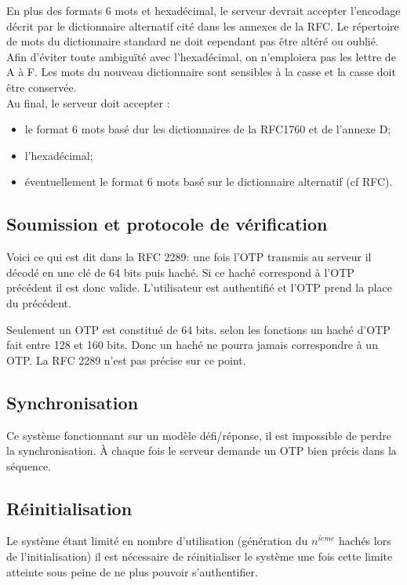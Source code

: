 \documentclass{../res/univ-projet}
\begin{document}
        En plus des formats 6 mots et hexadécimal, le serveur devrait accepter 
l'encodage décrit par le dictionnaire alternatif cité dans les annexes de la RFC. Le répertoire de mots du dictionnaire standard ne doit 
cependant pas être altéré ou oublié. Afin d'éviter toute ambiguïté avec 
l'hexadécimal, on n'emploiera pas les lettre de A à F. Les mots du nouveau dictionnaire sont 
sensibles à la casse et la casse doit être conservée.\\

        Au final, le serveur doit accepter :
        \begin{itemize}
            \item le format 6 mots basé dur les dictionnaires de la RFC1760 et de 
            l'annexe D;
            \item l'hexadécimal;
            \item éventuellement le format 6 mots basé sur le dictionnaire alternatif 
            (cf RFC).
        \end{itemize}
  
  \subsection{Soumission et protocole de vérification}
        Voici ce qui est dit dans la RFC 2289:
    une fois l'OTP transmis au serveur il décodé en une clé de 64 bits puis haché.
    Si ce haché correspond à l'OTP précédent il est donc valide.
    L'utilisateur est authentifié et l'OTP prend la place du précédent.
    
        Seulement un OTP est constitué de 64 bits. selon les fonctions un haché
    d'OTP fait entre 128 et 160 bits. Donc un haché ne pourra jamais correspondre
    à un OTP. La RFC 2289 n'est pas précise sur ce point.
  
  \subsection{Synchronisation}
    Ce système fonctionnant sur un modèle défi/réponse, il est impossible de perdre
    la synchronisation. À chaque fois le serveur demande un OTP bien précis dans la séquence.
  
  \subsection{Réinitialisation}
    Le système étant limité en nombre d'utilisation (génération du $n^{i\grave{e}me}$ 
    hachés lors de l'initialisation) il est nécessaire de réinitialiser le système
    une fois cette limite atteinte sous peine de ne plus pouvoir s'authentifier.
    
\end{document}
